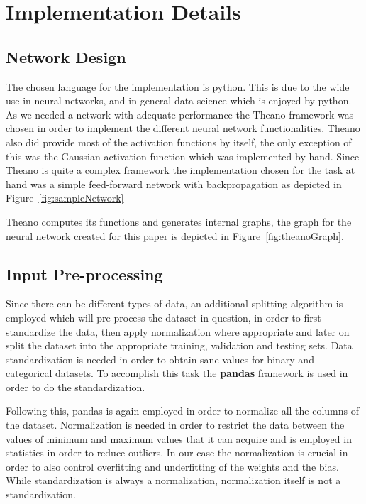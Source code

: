 \documentclass{article}
\begin{document}
\section{Implementation Details}
\label{sec:implementation_details}

\subsection{Network Design}
\label{sub:network_design}

The chosen language for the implementation is python. This is due to the wide use in neural networks, and in general data-science which is enjoyed by python. As we needed a network with adequate performance the Theano framework was chosen in order to implement the different neural network functionalities. Theano also did provide most of the activation functions by itself, the only exception of this was the Gaussian activation function which was implemented by hand. Since Theano is quite a complex framework the implementation chosen for the task at hand was a simple feed-forward network with backpropagation as depicted in Figure~\ref{fig:sampleNetwork}

Theano computes its functions and generates internal graphs, the graph for the neural network created for this paper is depicted in Figure~\ref{fig:theanoGraph}. 
\subsection{Input Pre-processing}
\label{sub:splitfunc}

Since there can be different types of data, an additional splitting algorithm is employed which will pre-process the dataset in question, in order to first standardize the data, then apply normalization where appropriate and later on split the dataset into the appropriate training, validation and testing sets. Data standardization is needed in order to obtain sane values for binary and categorical datasets. To accomplish this task the \textbf{pandas} framework is used in order to do the standardization. 

Following this, pandas is again employed in order to normalize all the columns of the dataset. Normalization is needed in order to restrict the data between the values of minimum and maximum values that it can acquire and is employed in statistics in order to reduce outliers. In our case the normalization is crucial in order to also control overfitting and underfitting of the weights and the bias. While standardization is always a normalization, normalization itself is not a standardization. 
\end{document}
